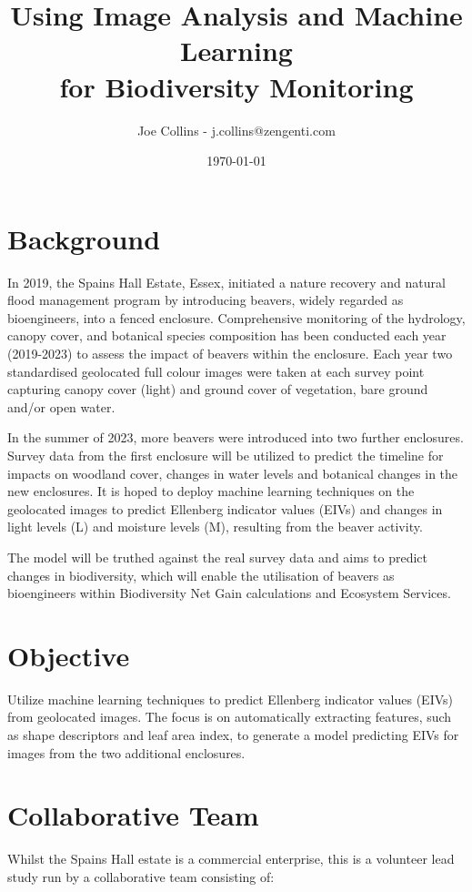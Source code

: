 \documentclass[12pt]{article}
\title{Using Image Analysis and Machine Learning\\for Biodiversity Monitoring}
\author{Joe Collins - j.collins@zengenti.com}
\date{\today}
\begin{document}
\maketitle

\section*{Background}

In 2019, the Spains Hall Estate, Essex,
initiated a nature recovery and natural flood management program by introducing beavers, widely regarded as bioengineers,
into a fenced enclosure.
Comprehensive monitoring of the hydrology, canopy cover, and botanical species composition has been conducted
each year (2019-2023) to assess the impact of beavers within the enclosure.
Each year two standardised geolocated full colour images were taken at each survey point
capturing canopy cover (light) and ground cover of vegetation,
bare ground and/or open water.

In the summer of 2023, more beavers were introduced into two further enclosures.
Survey data from the first enclosure will be utilized
to predict the timeline for impacts on woodland cover, changes in water levels and botanical changes in the new enclosures.
It is hoped to deploy machine learning techniques on the geolocated images
to predict Ellenberg indicator values (EIVs) and changes in light levels (L) and moisture levels (M), resulting from the beaver activity.

The model will be truthed against the real survey data and aims to predict changes in biodiversity,
which will enable the utilisation of beavers as bioengineers within Biodiversity Net Gain calculations and Ecosystem Services. 

\section*{Objective}

Utilize machine learning techniques to predict Ellenberg indicator values (EIVs)
from geolocated images.
The focus is on automatically extracting features,
such as shape descriptors and leaf area index,
to generate a model predicting EIVs for images from the two additional enclosures.

\section*{Collaborative Team}

Whilst the Spains Hall estate is a commercial enterprise,
this is a volunteer lead study
run by a collaborative team consisting of:
\end{document}
